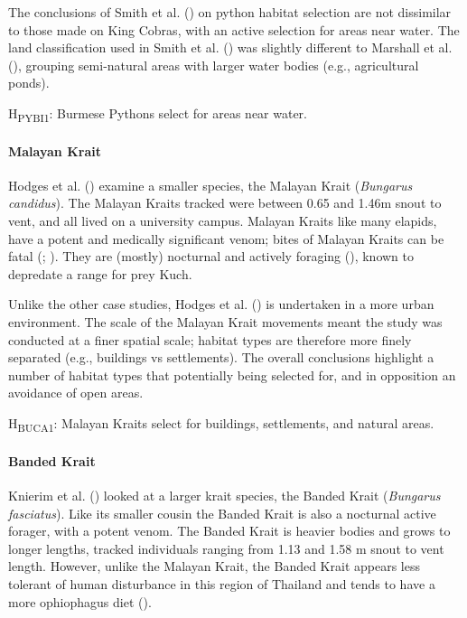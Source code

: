 \documentclass[10pt,a4paper]{article}
\begin{document}
The conclusions of Smith et al. () on python habitat selection are not dissimilar to those made on King Cobras, with an active selection for areas near water.
The land classification used in Smith et al. () was slightly different to Marshall et al. (), grouping semi-natural areas with larger water bodies (e.g., agricultural ponds).

H\textsubscript{PYBI1}: Burmese Pythons select for areas near water.

\paragraph{Malayan Krait}\label{malayan-krait}

Hodges et al. () examine a smaller species, the Malayan Krait (\emph{Bungarus candidus}).
The Malayan Kraits tracked were between 0.65 and 1.46m snout to vent, and all lived on a university campus.
Malayan Kraits like many elapids, have a potent and medically significant venom; bites of Malayan Kraits can be fatal (; ).
They are (mostly) nocturnal and actively foraging (), known to depredate a range for prey Kuch.

Unlike the other case studies, Hodges et al. () is undertaken in a more urban environment.
The scale of the Malayan Krait movements meant the study was conducted at a finer spatial scale; habitat types are therefore more finely separated (e.g., buildings vs settlements).
The overall conclusions highlight a number of habitat types that potentially being selected for, and in opposition an avoidance of open areas.

H\textsubscript{BUCA1}: Malayan Kraits select for buildings, settlements, and natural areas.

\paragraph{Banded Krait}\label{banded-krait}

Knierim et al. () looked at a larger krait species, the Banded Krait (\emph{Bungarus fasciatus}).
Like its smaller cousin the Banded Krait is also a nocturnal active forager, with a potent venom.
The Banded Krait is heavier bodies and grows to longer lengths, tracked individuals ranging from 1.13 and 1.58 m snout to vent length.
However, unlike the Malayan Krait, the Banded Krait appears less tolerant of human disturbance in this region of Thailand and tends to have a more ophiophagus diet ().
\end{document}
